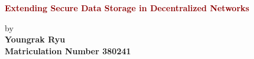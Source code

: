 \begin{titlepage}
	\strut
	\hfill
	\begin{center}
	\vspace{1cm}
		\Huge
		\begin{spacing}{.9}
			\textcolor{DarkRed}{\textbf{Extending Secure Data Storage in Decentralized Networks}}\\
		\end{spacing}
		\vspace{0.8cm}
		\large
		by\\
		\vspace{0.8cm}
		\textbf{Youngrak Ryu}\\
		\vspace{0.8cm}
		\textbf{Matriculation Number 380241}\\

\end{center}
\end{titlepage}
